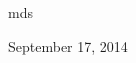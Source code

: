 \documentclass[journal]{IEEEtran}
\begin{document}
\hfill mds
 
\hfill September 17, 2014





%
%



%
%
\end{document}
